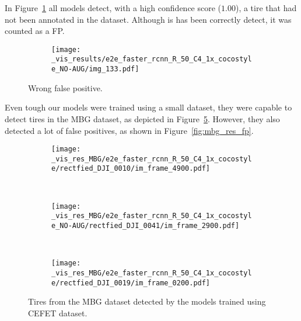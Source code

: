 In Figure~\ref{fig:wrong_fp} all models detect, with a high confidence score ($1.00$), a tire that had not been annotated in the dataset.
Although is has been correctly detect, it was counted as a FP.

\begin{figure}[th!]
  \centering
  \begin{subfigure}[t]{\linewidth}
    \centering
    \texttt{[image: \_vis\_results/e2e\_faster\_rcnn\_R\_50\_C4\_1x\_cocostyle\_NO-AUG/img\_133.pdf]}
  \end{subfigure}%
  \caption{Wrong false positive.}
  \label{fig:wrong_fp}
\end{figure}

Even tough our models were trained using a small dataset, they were capable to detect tires in the MBG dataset, as depicted in Figure~\ref{fig:mbg_res}.
However, they also detected a lot of false positives, as shown in Figure~\ref{fig:mbg_res_fp}.
%
\begin{figure}[th!]
  \centering
  \begin{subfigure}[t]{.33\linewidth}
    \centering
    \texttt{[image: \_vis\_res\_MBG/e2e\_faster\_rcnn\_R\_50\_C4\_1x\_cocostyle/rectfied\_DJI\_0010/im\_frame\_4900.pdf]}
    \label{fig:mbg_res_50N}
  \end{subfigure}~
  \begin{subfigure}[t]{0.33\linewidth}
    \centering
    \texttt{[image: \_vis\_res\_MBG/e2e\_faster\_rcnn\_R\_50\_C4\_1x\_cocostyle\_NO-AUG/rectfied\_DJI\_0041/im\_frame\_2900.pdf]}
    \label{fig:mbg_res_101}
  \end{subfigure}~
  \begin{subfigure}[t]{0.33\linewidth}
    \centering
    \texttt{[image: \_vis\_res\_MBG/e2e\_faster\_rcnn\_R\_50\_C4\_1x\_cocostyle/rectfied\_DJI\_0019/im\_frame\_0200.pdf]}
    \label{fig:mbg_res_50}
  \end{subfigure}
  \caption{Tires from the MBG dataset detected by the models trained using CEFET dataset.}
  \label{fig:mbg_res}
\end{figure}



